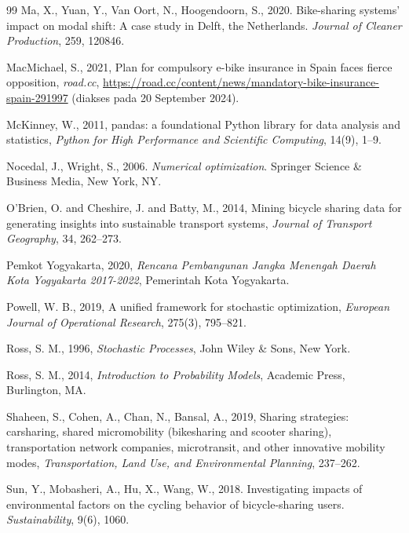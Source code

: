 \documentclass{skripsimathugm}
\begin{document}
\begin{thebibliography}{99}
Ma, X., Yuan, Y., Van Oort, N., Hoogendoorn, S., 2020. Bike-sharing systems' impact on modal shift: A case study in Delft, the Netherlands. \emph{Journal of Cleaner Production}, 259, 120846.

MacMichael, S., 2021, Plan for compulsory e-bike insurance in Spain faces fierce opposition, \emph{road.cc}, \url{https://road.cc/content/news/mandatory-bike-insurance-spain-291997} (diakses pada 20 September 2024).

McKinney, W., 2011, pandas: a foundational Python library for data analysis and statistics, \emph{Python for High Performance and Scientific Computing}, 14(9), 1--9.

Nocedal, J., Wright, S., 2006. \emph{Numerical optimization}. Springer Science \& Business Media, New York, NY.

O'Brien, O. and Cheshire, J. and Batty, M., 2014, Mining bicycle sharing data for generating insights into sustainable transport systems, \emph{Journal of Transport Geography}, 34, 262--273.

Pemkot Yogyakarta, 2020, \emph{Rencana Pembangunan Jangka Menengah Daerah Kota Yogyakarta 2017-2022}, Pemerintah Kota Yogyakarta.

Powell, W. B., 2019, A unified framework for stochastic optimization, \emph{European Journal of Operational Research}, 275(3), 795--821.

Ross, S. M., 1996, \emph{Stochastic Processes}, John Wiley \& Sons, New York.

Ross, S. M., 2014, \emph{Introduction to Probability Models}, Academic Press, Burlington, MA.

Shaheen, S., Cohen, A., Chan, N., Bansal, A., 2019, Sharing strategies: carsharing, shared micromobility (bikesharing and scooter sharing), transportation network companies, microtransit, and other innovative mobility modes, \emph{Transportation, Land Use, and Environmental Planning}, 237--262.

Sun, Y., Mobasheri, A., Hu, X., Wang, W., 2018. Investigating impacts of environmental factors on the cycling behavior of bicycle-sharing users. \emph{Sustainability}, 9(6), 1060.


\end{thebibliography}
\end{document}
